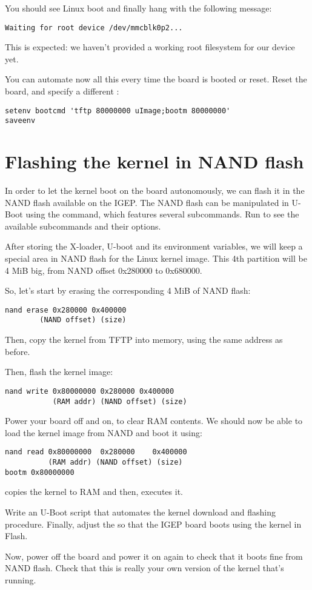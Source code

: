 You should see Linux boot and finally hang with the following message:

\begin{verbatim}
Waiting for root device /dev/mmcblk0p2...
\end{verbatim}

This is expected: we haven't provided a working root filesystem for
our device yet.

You can automate now all this every time the board is booted or
reset. Reset the board, and specify a different :

\begin{verbatim}
setenv bootcmd 'tftp 80000000 uImage;bootm 80000000'
saveenv
\end{verbatim}

\section{Flashing the kernel in NAND flash}

In order to let the kernel boot on the board autonomously, we can
flash it in the NAND flash available on the IGEP. The NAND flash can
be manipulated in U-Boot using the  command, which
features several subcommands. Run  to see the
available subcommands and their options.

After storing the X-loader, U-boot and its environment variables, we
will keep a special area in NAND flash for the Linux kernel image.
This 4th partition will be 4 MiB big, from NAND offset
0x280000 to 0x680000.

So, let's start by erasing the corresponding 4 MiB of NAND flash:

\begin{verbatim}
nand erase 0x280000 0x400000
        (NAND offset) (size)
\end{verbatim}

Then, copy the kernel from TFTP into memory, using the same address as
before.

Then, flash the kernel image:

\begin{verbatim}
nand write 0x80000000 0x280000 0x400000
           (RAM addr) (NAND offset) (size)
\end{verbatim}

Power your board off and on, to clear RAM contents. We should now be able to load
the kernel image from NAND and boot it using:

\begin{verbatim}
nand read 0x80000000  0x280000    0x400000
          (RAM addr) (NAND offset) (size)
bootm 0x80000000
\end{verbatim}

 copies the kernel to RAM and then, 
executes it.

Write an U-Boot script that automates the kernel download and flashing
procedure. Finally, adjust the  so that the IGEP board
boots using the kernel in Flash.

Now, power off the board and power it on again to check that it boots
fine from NAND flash. Check that this is really your own version of
the kernel that's running.
